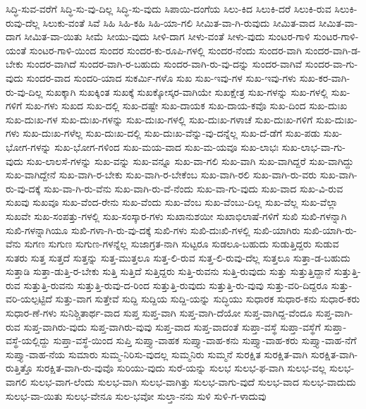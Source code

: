 {ಸಿದ್ಧಿ-ಸುವ-ವರೆಗೆ
ಸಿದ್ಧಿ-ಸು-ವು-ದಿಲ್ಲ
ಸಿದ್ಧಿ-ಸು-ವುದು
ಸಿಪಾಯಿ-ದಂಗೆಯ
ಸಿಲು-ಕಿದ
ಸಿಲುಕಿ-ದರೆ
ಸಿಲುಕಿ-ರುವ
ಸಿಲುಕಿ-ರುವು-ದೆಲ್ಲ
ಸಿಲುಕು-ವಂತೆ
ಸಿವೆ
ಸಿಹಿ
ಸಿಹಿ-ಕಹಿ
ಸಿಹಿ-ಯಾ-ಗಲಿ
ಸೀಮಿತ-ವಾ-ಗಿ-ರುವುದು
ಸೀಮಿತ-ವಾದ
ಸೀಮಿತ-ವಾ-ದಾಗ
ಸೀಮಿತ-ವಾ-ಯಿತು
ಸೀಮೆ
ಸೀಯು-ವುದು
ಸೀಳಿ-ದಾಗ
ಸೀಳು-ವಂತೆ
ಸೀಳು-ವುದು
ಸುಂಟರ-ಗಾಳಿ
ಸುಂಟರ-ಗಾಳಿ-ಯಂತೆ
ಸುಂಟರ-ಗಾಳಿ-ಯಿಂದ
ಸುಂದರ
ಸುಂದರ-ಕು-ರೂಪಿ-ಗಳಲ್ಲಿ
ಸುಂದರ-ನೆಂದು
ಸುಂದರ-ವಾಗಿ
ಸುಂದರ-ವಾಗಿ-ಡ-ಬೇಕು
ಸುಂದರ-ವಾಗಿದೆ
ಸುಂದರ-ವಾಗಿ-ರ-ಬಹುದು
ಸುಂದರ-ವಾಗಿ-ರು-ವು-ದನ್ನು
ಸುಂದರ-ವಾಗಿವೆ
ಸುಂದರ-ವಾ-ಗು-ವುದು
ಸುಂದರ-ವಾದ
ಸುಂದರಿ-ಯಾದ
ಸುಕರ್ಮಿ-ಗಳೊ
ಸುಖ
ಸುಖ-ಇವು-ಗಳ
ಸುಖ-ಇವು-ಗಳು
ಸುಖ-ಕರ-ವಾಗಿ-ರು-ವು-ದಿಲ್ಲ
ಸುಖಕ್ಕಾಗಿ
ಸುಖಕ್ಕಿಂತ
ಸುಖಕ್ಕೆ
ಸುಖಕ್ಕೋಸ್ಕರ-ವಾಗಿಯೇ
ಸುಖಕ್ಷೇತ್ರ
ಸುಖ-ಗಳನ್ನು
ಸುಖ-ಗಳಲ್ಲಿ
ಸುಖ-ಗಳಿಗೆ
ಸುಖ-ಗಳು
ಸುಖದ
ಸುಖ-ದಲ್ಲಿ
ಸುಖ-ದಷ್ಟೇ
ಸುಖ-ದಾಯಕ
ಸುಖ-ದಾಯ-ಕವೊ
ಸುಖ-ದಿಂದ
ಸುಖ-ದುಃಖ
ಸುಖ-ದುಃಖ-ಗಳ
ಸುಖ-ದುಃಖ-ಗಳನ್ನು
ಸುಖ-ದುಃಖ-ಗಳಲ್ಲಿ
ಸುಖ-ದುಃಖ-ಗಳಾಚೆ
ಸುಖ-ದುಃಖ-ಗಳಿಗೆ
ಸುಖ-ದುಃಖ-ಗಳು
ಸುಖ-ದುಃಖ-ಗಳೆಲ್ಲ
ಸುಖ-ದುಃಖ-ದಲ್ಲಿ
ಸುಖ-ದುಃಖ-ವೆನ್ನು-ವು-ದನ್ನೆಲ್ಲ
ಸುಖ-ದೆ-ಡೆಗೆ
ಸುಖ-ಪಡು
ಸುಖ-ಭೋಗ-ಗಳನ್ನು
ಸುಖ-ಭೋಗ-ಗಳಿಂದ
ಸುಖ-ಮಯ-ವಾದ
ಸುಖ-ಮ-ಯವೂ
ಸುಖ-ಲಾಭಃ
ಸುಖ-ಲಾಭ-ವಾ-ಗು-ವುದು
ಸುಖ-ಲಾಲಸೆ-ಗಳನ್ನು
ಸುಖ-ವನ್ನು
ಸುಖ-ವನ್ನೂ
ಸುಖ-ವಾ-ಗಲಿ
ಸುಖ-ವಾಗಿ
ಸುಖ-ವಾಗಿದ್ದರೆ
ಸುಖ-ವಾಗಿದ್ದು
ಸುಖ-ವಾಗಿದ್ದೇನೆ
ಸುಖ-ವಾಗಿ-ರ-ಬೇಕು
ಸುಖ-ವಾಗಿ-ರ-ಬೇಕೆಂಬ
ಸುಖ-ವಾಗಿ-ರಲಿ
ಸುಖ-ವಾಗಿ-ರು-ವರು
ಸುಖ-ವಾಗಿ-ರು-ವು-ದಕ್ಕೆ
ಸುಖ-ವಾ-ಗಿ-ರು-ವೆನು
ಸುಖ-ವಾಗಿ-ರು-ವೆ-ನೆಂದು
ಸುಖ-ವಾ-ಗು-ವುದು
ಸುಖ-ವಾದ
ಸುಖ-ವಿ-ರುವ
ಸುಖವು
ಸುಖವೂ
ಸುಖ-ವೆಂದ-ರೇನು
ಸುಖ-ವೆಂದು
ಸುಖ-ವೆಂಬ
ಸುಖ-ವೆಂಬು-ದಿಲ್ಲ
ಸುಖ-ವೆಲ್ಲ
ಸುಖ-ವೆಲ್ಲಾ
ಸುಖವೇ
ಸುಖ-ಸಂಪತ್ತು-ಗಳಲ್ಲಿ
ಸುಖ-ಸಂಸ್ಕಾರ-ಗಳು
ಸುಖಾನುಶಯೀ
ಸುಖಾಭಿಲಾಷೆ-ಗಳಿಗೆ
ಸುಖಿ
ಸುಖಿ-ಗಳನ್ನಾಗಿ
ಸುಖಿ-ಗಳನ್ನಾಗಿಯೂ
ಸುಖಿ-ಗಳಾ-ಗಿ-ರು-ವು-ದಕ್ಕೆ
ಸುಖಿ-ಗಳು
ಸುಖಿ-ದುಃಖಿ-ಗಳಲ್ಲಿ
ಸುಖಿ-ಯಾಗಿರು
ಸುಖಿ-ಯಾಗಿ-ರು-ವೆನು
ಸುಗಣ
ಸುಗುಣ
ಸುಗುಣ-ಗಳನ್ನೆಲ್ಲ
ಸುಜಾಗ್ರತ-ನಾಗಿ
ಸುಟ್ಟರೂ
ಸುಡಲೂ-ಬಹುದು
ಸುಡುತ್ತಿದ್ದರು
ಸುಡುವ
ಸುತರು
ಸುತ್ತ
ಸುತ್ತದೆ
ಸುತ್ತನ್ನು
ಸುತ್ತ-ಮುತ್ತಲೂ
ಸುತ್ತ-ಲಿ-ರುವ
ಸುತ್ತ-ಲಿ-ರುವು-ದೆಲ್ಲ
ಸುತ್ತಲೂ
ಸುತ್ತಾ-ಡ-ಬಹುದು
ಸುತ್ತಾಡಿ
ಸುತ್ತಾ-ಡುತ್ತಿ-ರ-ಬೇಕು
ಸುತ್ತಿ
ಸುತ್ತಿದೆ
ಸುತ್ತಿದ್ದರು
ಸುತ್ತಿ-ರುವನು
ಸುತ್ತಿ-ರುವುದು
ಸುತ್ತು
ಸುತ್ತುತ್ತಿದ್ದಾನೆ
ಸುತ್ತುತ್ತಿ-ರುವ
ಸುತ್ತುತ್ತಿ-ರುವನು
ಸುತ್ತುತ್ತಿ-ರುವು-ದ-ರಿಂದ
ಸುತ್ತುತ್ತಿ-ರುವುದು
ಸುತ್ತುತ್ತಿ-ರು-ವುವು
ಸುತ್ತು-ವರಿ-ದಿದ್ದರೂ
ಸುತ್ತು-ವರಿ-ಯಲ್ಪಟ್ಟಿದೆ
ಸುತ್ತು-ವಾಗ
ಸುತ್ತೇವೆ
ಸುದ್ದಿ
ಸುದ್ದಿಯ
ಸುದ್ದಿ-ಯನ್ನು
ಸುದ್ಧಿಯು
ಸುಧಾರಕ
ಸುಧಾರ-ಕನು
ಸುಧಾರ-ಕರು
ಸುಧಾರ-ಣೆ-ಗಳು
ಸುನಿಶ್ಚಿತಾರ್ಥ-ವಾದ
ಸುಪ್ತ
ಸುಪ್ತ-ವಾಗಿ
ಸುಪ್ತ-ವಾಗಿ-ದೆಯೋ
ಸುಪ್ತ-ವಾಗಿದ್ದ-ವೆಂದೂ
ಸುಪ್ತ-ವಾಗಿ-ರುವ
ಸುಪ್ತ-ವಾಗಿರು-ವುದು
ಸುಪ್ತ-ವಾಗಿರು-ವುವು
ಸುಪ್ತ-ವಾದ
ಸುಪ್ತ-ವಾದಂತೆ
ಸುಪ್ತಾ-ವಸ್ಥೆ
ಸುಪ್ತಾ-ವಸ್ಥೆಗೆ
ಸುಪ್ತಾ-ವಸ್ಥೆ-ಯಲ್ಲಿದ್ದು
ಸುಪ್ತಾ-ವಸ್ಥೆ-ಯಿಂದ
ಸುಪ್ತಿ
ಸುಪ್ತ್ಯಾ-ವಾಹಕ
ಸುಪ್ತ್ಯಾ-ವಾಹ-ಕನು
ಸುಪ್ತ್ಯಾ-ವಾಹ-ಕರು
ಸುಪ್ತ್ಯಾ-ವಾಹ-ನೆಗೆ
ಸುಪ್ತ್ಯಾ-ವಾಹ-ನೆಯ
ಸುಮಾರು
ಸುಮ್ಮ-ನಿರಿಸು-ವುದಲ್ಲ
ಸುಮ್ಮನಿರು
ಸುಮ್ಮನೆ
ಸುರಕ್ಷಿತ
ಸುರಕ್ಷಿತ-ವಾಗಿ
ಸುರಕ್ಷಿತ-ವಾಗಿ-ರುತ್ತಿತ್ತೊ
ಸುರಕ್ಷಿತ-ವಾಗಿ-ರು-ವುವೊ
ಸುರಿಯು-ವುದು
ಸುರೆ-ಯನ್ನು
ಸುಲಭ
ಸುಲಭ-ಫ-ವಾಗಿ
ಸುಲಭ-ವಲ್ಲ
ಸುಲಭ-ವಾಗಲಿ
ಸುಲಭ-ವಾಗ-ಲೆಂದು
ಸುಲಭ-ವಾಗಿ
ಸುಲಭ-ವಾಗಿತ್ತು
ಸುಲಭ-ವಾಗು-ವುದೆ
ಸುಲಭ-ವಾದ
ಸುಲಭ-ವಾದುದು
ಸುಲಭ-ವಾ-ಯಿತು
ಸುಲಭ-ವೇನೂ
ಸುಲ-ಭವೋ
ಸುಲ್ತಾ-ನನು
ಸುಳಿ
ಸುಳಿ-ಗ-ಳಾದುವು
}
